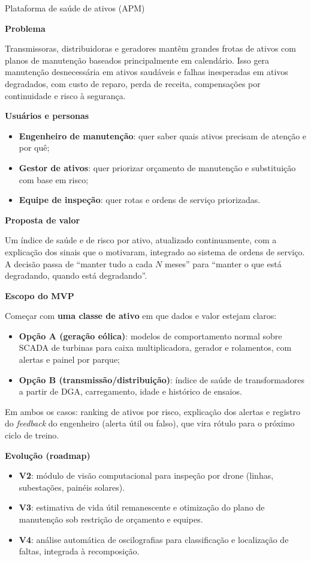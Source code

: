 \documentclass[10pt,a4paper,oneside]{article}
\newcommand{\prodsec}[1]{\par\medskip\noindent\textbf{\color{prodcolor}#1}\par\smallskip}
\begin{document}
\begin{produto}{Plataforma de saúde de ativos (APM)}

\prodsec{Problema}
Transmissoras, distribuidoras e geradores mantêm grandes frotas de ativos com
planos de manutenção baseados principalmente em calendário. Isso gera
manutenção desnecessária em ativos saudáveis e falhas inesperadas em ativos
degradados, com custo de reparo, perda de receita, compensações por
continuidade e risco à segurança.

\prodsec{Usuários e personas}
\begin{itemize}
  \item \textbf{Engenheiro de manutenção}: quer saber quais ativos precisam de
    atenção e por quê;
  \item \textbf{Gestor de ativos}: quer priorizar orçamento de manutenção e
    substituição com base em risco;
  \item \textbf{Equipe de inspeção}: quer rotas e ordens de serviço
    priorizadas.
\end{itemize}

\prodsec{Proposta de valor}
Um índice de saúde e de risco por ativo, atualizado continuamente, com a
explicação dos sinais que o motivaram, integrado ao sistema de ordens de
serviço. A decisão passa de ``manter tudo a cada $N$ meses'' para ``manter o
que está degradando, quando está degradando''.

\prodsec{Escopo do MVP}
Começar com \textbf{uma classe de ativo} em que dados e valor estejam claros:
\begin{itemize}
  \item \textbf{Opção A (geração eólica)}: modelos de comportamento normal
    sobre SCADA de turbinas para caixa multiplicadora, gerador e rolamentos,
    com alertas e painel por parque;
  \item \textbf{Opção B (transmissão/distribuição)}: índice de saúde de
    transformadores a partir de DGA, carregamento, idade e histórico de
    ensaios.
\end{itemize}
Em ambos os casos: ranking de ativos por risco, explicação dos alertas e
registro do \textit{feedback} do engenheiro (alerta útil ou falso), que vira
rótulo para o próximo ciclo de treino.

\prodsec{Evolução (roadmap)}
\begin{itemize}
  \item \textbf{V2}: módulo de visão computacional para inspeção por drone
    (linhas, subestações, painéis solares).
  \item \textbf{V3}: estimativa de vida útil remanescente e otimização do
    plano de manutenção sob restrição de orçamento e equipes.
  \item \textbf{V4}: análise automática de oscilografias para
    classificação e localização de faltas, integrada à recomposição.
\end{itemize}


\end{produto}
\end{document}
